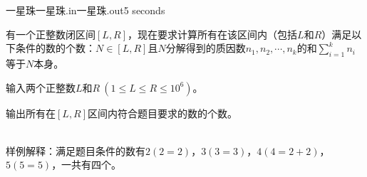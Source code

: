 \begin{problem}{一星珠}{一星珠.in}{一星珠.out}{5 seconds}


有一个正整数闭区间$[L,R]$，现在要求计算所有在该区间内（包括$L$和$R$）满足以下条件的数的个数：$N\in [L,R]$且$N$分解得到的质因数$n_1,n_2,\cdots,n_k$的和$\sum\limits_{i=1}^kn_i$等于$N$本身。

\InputFile

输入两个正整数$L$和$R\ (1\le L\le R\le 10^6)$。

\OutputFile

输出所有在$[L,R]$区间内符合题目要求的数的个数。

\Examples

\begin{example}
%
\end{example}
\\
样例解释：满足题目条件的数有$2(2=2)$，$3(3=3)$，$4(4=2+2)$，$5(5=5)$，一共有四个。

\end{problem}
